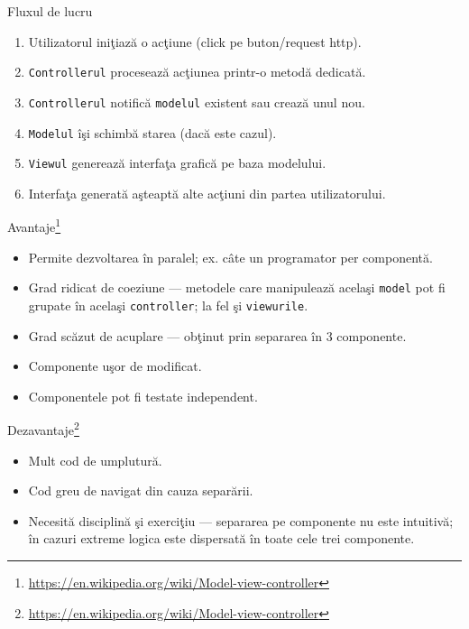 \documentclass[presentation]{beamer}
\begin{document}
\begin{frame}[label={sec:orga5d2c48},fragile]{Fluxul de lucru}
 \begin{enumerate}
\item Utilizatorul iniţiază o acţiune (click pe buton/request http).
\item \texttt{Controllerul} procesează acţiunea printr-o metodă dedicată.
\item \texttt{Controllerul} notifică \texttt{modelul} existent sau crează unul nou.
\item \texttt{Modelul} îşi schimbă starea (dacă este cazul).
\item \texttt{Viewul} generează interfaţa grafică pe baza modelului.
\item Interfaţa generată aşteaptă alte acţiuni din partea utilizatorului.
\end{enumerate}
\end{frame}
\begin{frame}[label={sec:orgddb36fc},fragile]{Avantaje\footnote{\url{https://en.wikipedia.org/wiki/Model-view-controller}}}
 \begin{itemize}
\item Permite dezvoltarea în paralel; ex. câte un programator per componentă.
\item Grad ridicat de coeziune --- metodele care manipulează acelaşi \texttt{model} pot fi grupate în acelaşi \texttt{controller}; la fel şi \texttt{viewurile}.
\item Grad scăzut de acuplare --- obţinut prin separarea în 3 componente.
\item Componente uşor de modificat.
\item Componentele pot fi testate independent.
\end{itemize}
\end{frame}
\begin{frame}[label={sec:orgb8ab39d}]{Dezavantaje\footnote{\url{https://en.wikipedia.org/wiki/Model-view-controller}}}
\begin{itemize}
\item Mult cod de umplutură.
\item Cod greu de navigat din cauza separării.
\item Necesită disciplină şi exerciţiu --- separarea pe componente nu este intuitivă; în cazuri extreme logica este dispersată în toate cele trei componente.
\end{itemize}
\end{frame}
\end{document}

